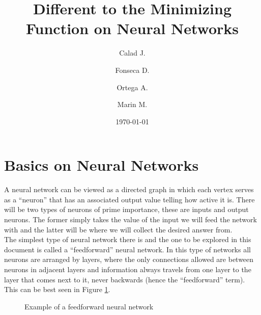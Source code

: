 \documentclass[a4paper, 12pt]{amsart}
\title{Different to the Minimizing Function on Neural Networks}
\author{Calad J.}
\author{Fonseca D.}
\author{Ortega A.}
\author{Marin M.}
\date{\today}
\begin{document}
\maketitle
\tableofcontents
\section{Basics on Neural Networks}
A neural network can be viewed as a directed graph in which each vertex serves
as a ``neuron'' that has an associated output value telling how active it is.
There will be two types of neurons of prime importance, these are inputs and
output neurons. The former simply takes the value of the input we will feed the
network with and the latter will be where we will collect the desired answer
from.\\
The simplest type of neural network there is and the one to be explored
in this document is called  a ``feedforward'' neural network. In this type of
networks all neurons are arranged by layers, where the only connections allowed
are between neurons in adjacent layers and information always travels from one
layer to the layer that comes next to it, never backwards (hence the
``feedforward'' term). This can be best seen in Figure
\ref{fig:feedforward example}.

\begin{figure}[!ht]
  \centering
  \def\layersep{2.5cm}

  \caption{Example of a feedforward neural network}
  \label{fig:feedforward example}
\end{figure}
\end{document}
